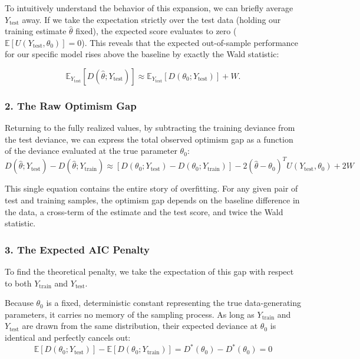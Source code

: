 \documentclass[
  letterpaper,
  DIV=11,
  numbers=noendperiod]{scrreprt}
\renewcommand{\[}{\begin{equation}}
\renewcommand{\]}{\end{equation}}
\theoremstyle{definition}
\theoremstyle{plain}
\theoremstyle{plain}
\theoremstyle{plain}
\theoremstyle{definition}
\theoremstyle{plain}
\theoremstyle{remark}
\begin{document}
To intuitively understand the behavior of this expansion, we can briefly
average \(Y_{\mathrm{test}}\) away. If we take the expectation strictly
over the test data (holding our training estimate \(\hat{\theta}\)
fixed), the expected score evaluates to zero
(\(\mathbb{E}[U(Y_{\mathrm{test}}, \theta_0)] = 0\)). This reveals that
the expected out-of-sample performance for our specific model rises
above the baseline by exactly the Wald statistic:

\[\boxed{\mathbb{E}_{Y_{\mathrm{test}}}[D(\hat{\theta}; Y_{\mathrm{test}})] \approx \mathbb{E}_{Y_{\mathrm{test}}}[D(\theta_0; Y_{\mathrm{test}})] + W}.\]

\subsubsection*{2. The Raw Optimism Gap}\label{the-raw-optimism-gap}

Returning to the fully realized values, by subtracting the training
deviance from the test deviance, we can express the total observed
optimism gap as a function of the deviance evaluated at the true
parameter \(\theta_0\): \[
D(\hat{\theta}; Y_{\mathrm{test}}) - D(\hat{\theta}; Y_{\mathrm{train}}) \approx \left[ D(\theta_0; Y_{\mathrm{test}}) - D(\theta_0; Y_{\mathrm{train}}) \right] - 2(\hat{\theta} - \theta_0)^T U(Y_{\mathrm{test}}, \theta_0) + 2W
\]

This single equation contains the entire story of overfitting. For any
given pair of test and training samples, the optimism gap depends on the
baseline difference in the data, a cross-term of the estimate and the
test score, and twice the Wald statistic.

\subsubsection*{3. The Expected AIC
Penalty}\label{the-expected-aic-penalty}

To find the theoretical penalty, we take the expectation of this gap
with respect to both \(Y_{\mathrm{train}}\) and \(Y_{\mathrm{test}}\).

Because \(\theta_0\) is a fixed, deterministic constant representing the
true data-generating parameters, it carries no memory of the sampling
process. As long as \(Y_{\mathrm{train}}\) and \(Y_{\mathrm{test}}\) are
drawn from the same distribution, their expected deviance at
\(\theta_0\) is identical and perfectly cancels out: \[
\mathbb{E}[D(\theta_0; Y_{\mathrm{test}})] - \mathbb{E}[D(\theta_0; Y_{\mathrm{train}})] = D^*(\theta_0) - D^*(\theta_0) = 0
\]
\end{document}
